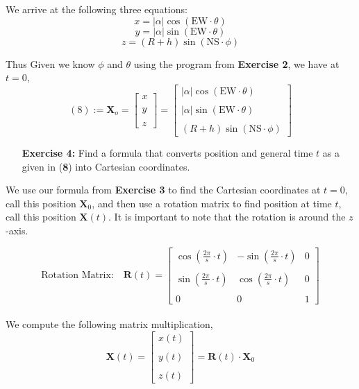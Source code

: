 \documentclass[11pt]{article}
\theoremstyle{definition}
\newcommand{\1}[1]{\mathbf{1} \left \{ #1 \right \}}
\begin{document}
We arrive at the following three equations:
\[x = |\alpha| \cos (\textrm{EW} \cdot \theta)\]
\[y = |\alpha| \sin (\textrm{EW} \cdot \theta) \]
\[z = (R + h) \sin (\textrm{NS} \cdot \phi)\]

Thus Given we know $\phi$ and $\theta$ using the program from \textbf{Exercise 2}, we have at $t=0$,
\[(8):= \textbf{X}_o = \begin{bmatrix} x \\ \\ y \\ \\ z \end{bmatrix} = \begin{bmatrix}
|\alpha| \cos (\textrm{EW} \cdot \theta) \\ \\ |\alpha| \sin (\textrm{EW} \cdot \theta) \\ \\ (R + h) \sin (\textrm{NS} \cdot \phi) \end{bmatrix}\]

\begin{itemize}
\item[{\textbf{Exercise 4:}}] Find a formula that converts position and general time $t$ as a given in (\textbf{8}) into Cartesian coordinates.
\end{itemize}
We use our formula from \textbf{Exercise 3} to find the Cartesian coordinates at $t=0$, call this position $\textbf{X}_0$, and then use a rotation matrix to find position at time $t$, call this position $\textbf{X}(t)$.  It is important to note that the rotation is around the $z$-axis.

\[\textrm{Rotation Matrix:} \quad \textbf{R}(t) = \begin{bmatrix}
\cos \left(\frac{2\pi}{s} \cdot t\right) & -\sin \left(\frac{2\pi}{s} \cdot t\right) & 0 \\ \\
\sin \left(\frac{2\pi}{s} \cdot t\right) & \cos \left(\frac{2\pi}{s} \cdot t\right) & 0 \\ \\
0 & 0 & 1 \end{bmatrix}\] \\
We compute the following matrix multiplication,
\[\textbf{X}(t) = \begin{bmatrix} x(t) \\ \\ y(t) \\ \\ z(t) \end{bmatrix} = \textbf{R}(t) \cdot \textbf{X}_0\]
\end{document}
